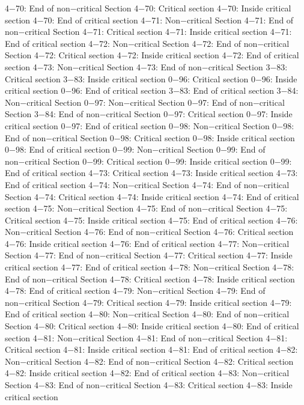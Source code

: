 4−70: End of non−critical Section
4−70: Critical section
4−70: Inside critical section
4−70: End of critical section
4−71: Non−critical Section
4−71: End of non−critical Section
4−71: Critical section
4−71: Inside critical section
4−71: End of critical section
4−72: Non−critical Section
4−72: End of non−critical Section
4−72: Critical section
4−72: Inside critical section
4−72: End of critical section
4−73: Non−critical Section
4−73: End of non−critical Section
3−83: Critical section
3−83: Inside critical section
0−96: Critical section
0−96: Inside critical section
0−96: End of critical section
3−83: End of critical section
3−84: Non−critical Section
0−97: Non−critical Section
0−97: End of non−critical Section
3−84: End of non−critical Section
0−97: Critical section
0−97: Inside critical section
0−97: End of critical section
0−98: Non−critical Section
0−98: End of non−critical Section
0−98: Critical section
0−98: Inside critical section
0−98: End of critical section
0−99: Non−critical Section
0−99: End of non−critical Section
0−99: Critical section
0−99: Inside critical section
0−99: End of critical section
4−73: Critical section
4−73: Inside critical section
4−73: End of critical section
4−74: Non−critical Section
4−74: End of non−critical Section
4−74: Critical section
4−74: Inside critical section
4−74: End of critical section
4−75: Non−critical Section
4−75: End of non−critical Section
4−75: Critical section
4−75: Inside critical section
4−75: End of critical section
4−76: Non−critical Section
4−76: End of non−critical Section
4−76: Critical section
4−76: Inside critical section
4−76: End of critical section
4−77: Non−critical Section
4−77: End of non−critical Section
4−77: Critical section
4−77: Inside critical section
4−77: End of critical section
4−78: Non−critical Section
4−78: End of non−critical Section
4−78: Critical section
4−78: Inside critical section
4−78: End of critical section
4−79: Non−critical Section
4−79: End of non−critical Section
4−79: Critical section
4−79: Inside critical section
4−79: End of critical section
4−80: Non−critical Section
4−80: End of non−critical Section
4−80: Critical section
4−80: Inside critical section
4−80: End of critical section
4−81: Non−critical Section
4−81: End of non−critical Section
4−81: Critical section
4−81: Inside critical section
4−81: End of critical section
4−82: Non−critical Section
4−82: End of non−critical Section
4−82: Critical section
4−82: Inside critical section
4−82: End of critical section
4−83: Non−critical Section
4−83: End of non−critical Section
4−83: Critical section
4−83: Inside critical section
